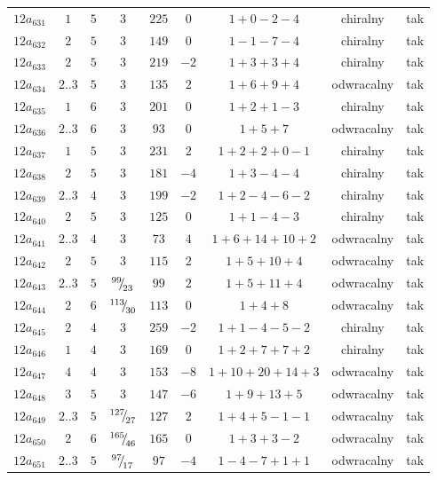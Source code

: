\begin{longtable}{ccccccccc}
$12a_{631}$ & $1$ & $5$ & $3$ & $225$ & $0$ & $1+0-2-4$ & chiralny & tak \\
$12a_{632}$ & $2$ & $5$ & $3$ & $149$ & $0$ & $1-1-7-4$ & chiralny & tak \\
$12a_{633}$ & $2$ & $5$ & $3$ & $219$ & $-2$ & $1+3+3+4$ & chiralny & tak \\
$12a_{634}$ & $2..3$ & $5$ & $3$ & $135$ & $2$ & $1+6+9+4$ & odwracalny & tak \\
$12a_{635}$ & $1$ & $6$ & $3$ & $201$ & $0$ & $1+2+1-3$ & chiralny & tak \\
$12a_{636}$ & $2..3$ & $6$ & $3$ & $93$ & $0$ & $1+5+7$ & odwracalny & tak \\
$12a_{637}$ & $1$ & $5$ & $3$ & $231$ & $2$ & $1+2+2+0-1$ & chiralny & tak \\
$12a_{638}$ & $2$ & $5$ & $3$ & $181$ & $-4$ & $1+3-4-4$ & chiralny & tak \\
$12a_{639}$ & $2..3$ & $4$ & $3$ & $199$ & $-2$ & $1+2-4-6-2$ & chiralny & tak \\
$12a_{640}$ & $2$ & $5$ & $3$ & $125$ & $0$ & $1+1-4-3$ & chiralny & tak \\
$12a_{641}$ & $2..3$ & $4$ & $3$ & $73$ & $4$ & $1+6+14+10+2$ & odwracalny & tak \\
$12a_{642}$ & $2$ & $5$ & $3$ & $115$ & $2$ & $1+5+10+4$ & odwracalny & tak \\
$12a_{643}$ & $2..3$ & $5$ & ${}^{99}{\mskip -5mu/\mskip -3mu}_{23}$ & $99$ & $2$ & $1+5+11+4$ & odwracalny & tak \\
$12a_{644}$ & $2$ & $6$ & ${}^{113}{\mskip -5mu/\mskip -3mu}_{30}$ & $113$ & $0$ & $1+4+8$ & odwracalny & tak \\
$12a_{645}$ & $2$ & $4$ & $3$ & $259$ & $-2$ & $1+1-4-5-2$ & chiralny & tak \\
$12a_{646}$ & $1$ & $4$ & $3$ & $169$ & $0$ & $1+2+7+7+2$ & chiralny & tak \\
$12a_{647}$ & $4$ & $4$ & $3$ & $153$ & $-8$ & $1+10+20+14+3$ & odwracalny & tak \\
$12a_{648}$ & $3$ & $5$ & $3$ & $147$ & $-6$ & $1+9+13+5$ & odwracalny & tak \\
$12a_{649}$ & $2..3$ & $5$ & ${}^{127}{\mskip -5mu/\mskip -3mu}_{27}$ & $127$ & $2$ & $1+4+5-1-1$ & odwracalny & tak \\
$12a_{650}$ & $2$ & $6$ & ${}^{165}{\mskip -5mu/\mskip -3mu}_{46}$ & $165$ & $0$ & $1+3+3-2$ & odwracalny & tak \\
$12a_{651}$ & $2..3$ & $5$ & ${}^{97}{\mskip -5mu/\mskip -3mu}_{17}$ & $97$ & $-4$ & $1-4-7+1+1$ & odwracalny & tak \\

\end{longtable}
